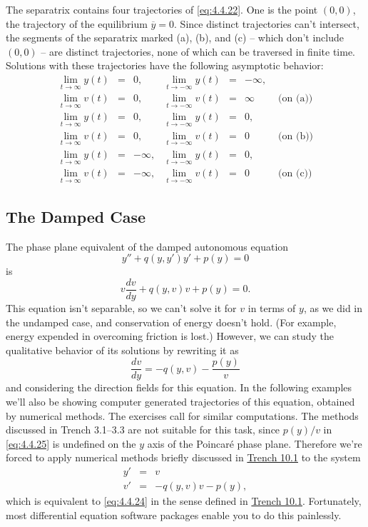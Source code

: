 \documentclass{ximera}
\begin{document}
\begin{example}
The separatrix contains four trajectories of \eqref{eq:4.4.22}. One is the
point $(0,0)$, the trajectory of the equilibrium $\overline{y}=0$.
Since distinct trajectories can't intersect, the segments of the
separatrix marked (a), (b), and (c) -- which don't include $(0,0)$ --
are distinct trajectories, none of which can be traversed in finite
time. Solutions with these trajectories have the following asymptotic
behavior:
$$
\begin{array}{llrllrl}
\lim_{t\rightarrow\infty}y(t)&=&0, &\lim_{t\rightarrow-\infty}y(t)&=&-\infty,\\
\lim_{t\rightarrow\infty}v(t)&=&0,
&\lim_{t\rightarrow-\infty}v(t)&=&\infty&
\mbox{ (on (a))}  \\
\lim_{t\rightarrow\infty}y(t)&=&0, &\lim_{t\rightarrow-\infty}y(t)&=&0,\\
\lim_{t\rightarrow\infty}v(t)&=&0,
&\lim_{t\rightarrow-\infty}v(t)&=&0&
\mbox{ (on (b))}  \\
\lim_{t\rightarrow\infty}y(t)&=&-\infty, &\lim_{t\rightarrow-\infty}y(t)&=&0,\\
\lim_{t\rightarrow\infty}v(t)&=&-\infty,
&\lim_{t\rightarrow-\infty}v(t)&=&0&
\mbox{ (on (c))}
\end{array}
$$
\end{example}
 
 
\subsection*{The Damped Case}
 
The phase plane equivalent of the damped autonomous equation
\begin{equation} \label{eq:4.4.24}
y''+q(y,y')y'+p(y)=0
\end{equation}
is
$$
v\frac{dv}{dy}+q(y,v)v+p(y)=0.
$$
This equation isn't  separable, so we can't solve it for $v$ in terms
of
$y$,
as we did in the undamped case, and conservation of energy doesn't
hold. (For example, energy expended in overcoming friction is lost.)
However, we can study the qualitative behavior of its solutions by
rewriting it as
\begin{equation} \label{eq:4.4.25}
\frac{dv}{dy}=-q(y,v)-\frac{p(y)}{v}
\end{equation}
and considering the direction fields for this equation. In the
following examples we'll also be showing computer generated
trajectories of this equation, obtained by numerical methods. The
exercises call for similar computations. 
The methods discussed in
Trench 3.1--3.3 are not suitable for this
task, since  $p(y)/v$ in \eqref{eq:4.4.25} is undefined on the $y$ axis
of the Poincar\'e phase plane. Therefore we're forced to apply
numerical methods briefly discussed in
\href{https://ximera.osu.edu/ode/main/introToSystems/introToSystems}{Trench 10.1} to the
system
\begin{eqnarray*}
y'&=&v\\
v'&=&-q(y,v)v-p(y),
\end{eqnarray*}
which is equivalent to \eqref{eq:4.4.24} 
in the sense defined in \href{https://ximera.osu.edu/ode/main/introToSystems/introToSystems}{Trench 10.1}. 
Fortunately, most differential equation software
packages  enable you to do this painlessly.
 
\end{document}
